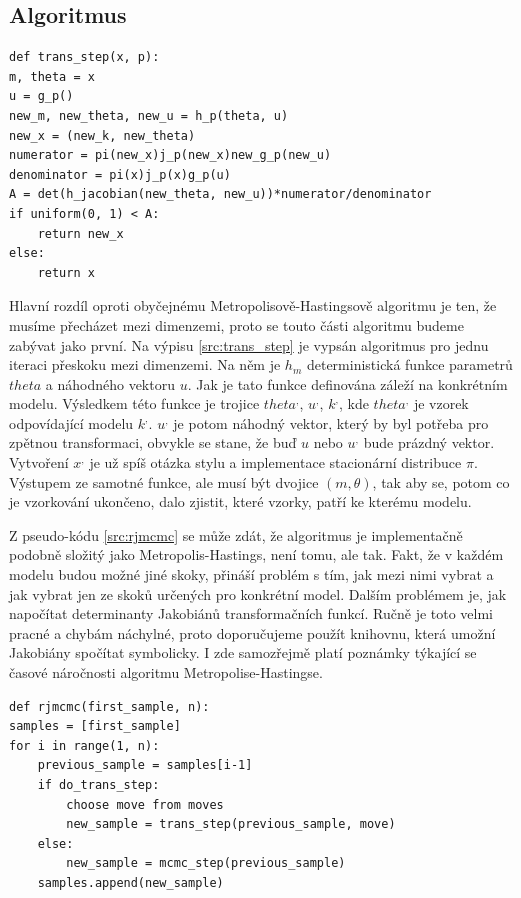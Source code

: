 \documentclass[czech,master,public,dept470,male,cpdeclaration,oneside, python]{diploma}
\begin{document}
\subsection{Algoritmus}
\begin{lstlisting}[label=src:trans_step,caption=Algoritmus pro mezi dimenzionální skok]
def trans_step(x, p):
m, theta = x
u = g_p()
new_m, new_theta, new_u = h_p(theta, u)
new_x = (new_k, new_theta)
numerator = pi(new_x)j_p(new_x)new_g_p(new_u)
denominator = pi(x)j_p(x)g_p(u)
A = det(h_jacobian(new_theta, new_u))*numerator/denominator
if uniform(0, 1) < A:
    return new_x
else:
	return x
\end{lstlisting}
Hlavní rozdíl oproti obyčejnému Metropolisově-Hastingsově algoritmu je ten, že musíme přecházet mezi dimenzemi, proto se touto části algoritmu budeme zabývat jako první. Na výpisu \ref{src:trans_step} je vypsán algoritmus pro jednu iteraci přeskoku mezi dimenzemi. Na něm je $h_m$  deterministická funkce parametrů $theta$ a náhodného vektoru $u$. Jak je tato funkce definována záleží na konkrétním modelu. Výsledkem této funkce je trojice $theta^{,}$, $u^{,}$, $k^{,}$, kde $theta^{,}$ je vzorek odpovídající modelu $k^{,}$. $u^{,}$ je potom náhodný vektor, který by byl potřeba pro zpětnou transformaci, obvykle se stane, že buď $u$ nebo $u^{,}$ bude prázdný vektor. Vytvoření $x^{,}$ je už spíš otázka stylu a implementace stacionární distribuce $\pi$. Výstupem ze samotné funkce, ale musí být dvojice $(m, \theta)$, tak aby se, potom co je vzorkování ukončeno, dalo zjistit, které vzorky, patří ke kterému modelu. \par
Z pseudo-kódu \ref{src:rjmcmc} se může zdát, že algoritmus je implementačně podobně složitý jako Metropolis-Hastings, není tomu, ale tak. Fakt, že v každém modelu budou možné jiné skoky, přináší problém s tím, jak mezi nimi vybrat a jak vybrat jen ze skoků určených pro konkrétní model. Dalším problémem je, jak napočítat determinanty Jakobiánů transformačních funkcí. Ručně je toto velmi pracné a chybám náchylné, proto doporučujeme použít knihovnu, která umožní Jakobiány spočítat symbolicky. I zde samozřejmě platí poznámky týkající se časové náročnosti algoritmu Metropolise-Hastingse.
\begin{lstlisting}[label=src:rjmcmc,caption=Celkový RJMCMC algoritmus]
def rjmcmc(first_sample, n):
samples = [first_sample]
for i in range(1, n):
	previous_sample = samples[i-1]
	if do_trans_step:
		choose move from moves
		new_sample = trans_step(previous_sample, move)
	else:
		new_sample = mcmc_step(previous_sample)
	samples.append(new_sample)
\end{lstlisting}
\end{document}
